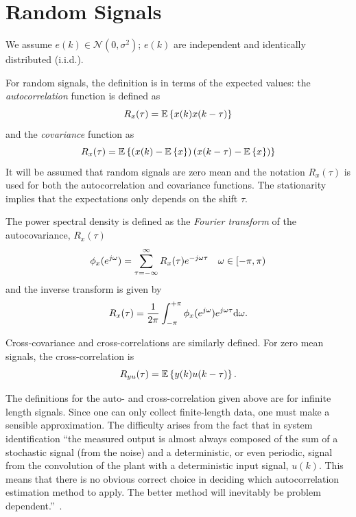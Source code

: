 \section{Random Signals}
\label{sec:random-signals}

We assume $e(k)\in \mathcal{N}(0,\sigma^2)$; $e(k)$ are independent and identically distributed (i.i.d.).

For random signals, the definition is in terms of the expected values: the \emph{autocorrelation} function is defined as
\begin{equation*}
  R_x(\tau) = \mathbb{E}\left\{x(k)x(k-\tau)\right\}
\end{equation*}
and the \emph{covariance} function as
\begin{equation*}
  R_x(\tau) = \mathbb{E}\left\{\left(x(k) - \mathbb{E}\left\{x\right\}\right)\left(x(k-\tau)-\mathbb{E}\left\{x\right\}\right)\right\}
\end{equation*}
It will be assumed that random signals are zero mean and the notation $R_x(\tau)$ is used for both the autocorrelation and covariance functions. The stationarity implies that the expectations only depends on the shift $\tau$.

The power spectral density is defined as the \emph{Fourier transform} of the autocovariance, $R_x(\tau)$
\begin{equation*}
  \phi_x(e^{j\omega}) = \sum_{\tau=-\infty}^\infty R_x(\tau)e^{-j\omega\tau} \hspace{1em} \omega\in[-\pi,\pi)
\end{equation*}
and the inverse transform is given by
\begin{equation*}
  R_x(\tau) = \frac{1}{2\pi}\int_{-\pi}^{+\pi} \phi_x(e^{j\omega})e^{j\omega\tau}\mathrm{d} \omega.
\end{equation*}

Cross-covariance and cross-correlations are similarly defined. For zero mean signals, the cross-correlation is
\begin{equation*}
  R_{yu}(\tau) = \mathbb{E}\left\{y(k)u(k-\tau)\right\}.
\end{equation*}

The definitions for the auto- and cross-correlation given above are for infinite length signals. Since one can only collect finite-length data, one must make a sensible approximation. The difficulty arises from the fact that in system identification ``the measured output is almost always composed of the sum of a stochastic signal (from the noise) and a deterministic, or even periodic, signal from the convolution of the plant with a deterministic input signal, $u(k)$. This means that there is no obvious correct choice in deciding which autocorrelation estimation method to apply. The better method will inevitably be problem dependent.''~\cite{smith-suppl4}.

